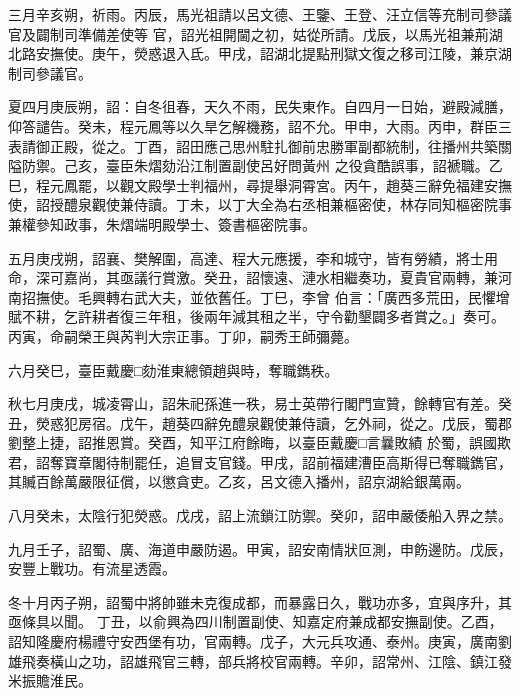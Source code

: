 \begin{pinyinscope}
 三月辛亥朔，祈雨。丙辰，馬光祖請以呂文德、王鑒、王登、汪立信等充制司參議官及闢制司準備差使等
 官，詔光祖開閫之初，姑從所請。戊辰，以馬光祖兼荊湖北路安撫使。庚午，熒惑退入氐。甲戌，詔湖北提點刑獄文復之移司江陵，兼京湖制司參議官。



 夏四月庚辰朔，詔：自冬徂春，天久不雨，民失東作。自四月一日始，避殿減膳，仰答譴告。癸未，程元鳳等以久旱乞解機務，詔不允。甲申，大雨。丙申，群臣三表請御正殿，從之。丁酉，詔田應己思州駐扎御前忠勝軍副都統制，往播州共築關隘防禦。己亥，臺臣朱熠劾沿江制置副使呂好問黃州
 之役貪酷誤事，詔褫職。乙巳，程元鳳罷，以觀文殿學士判福州，尋提舉洞霄宮。丙午，趙葵三辭免福建安撫使，詔授醴泉觀使兼侍讀。丁未，以丁大全為右丞相兼樞密使，林存同知樞密院事兼權參知政事，朱熠端明殿學士、簽書樞密院事。



 五月庚戌朔，詔襄、樊解圍，高達、程大元應援，李和城守，皆有勞績，將士用命，深可嘉尚，其亟議行賞激。癸丑，詔懷遠、漣水相繼奏功，夏貴官兩轉，兼河南招撫使。毛興轉右武大夫，並依舊任。丁巳，李曾
 伯言：「廣西多荒田，民懼增賦不耕，乞許耕者復三年租，後兩年減其租之半，守令勸墾闢多者賞之。」奏可。丙寅，命嗣榮王與芮判大宗正事。丁卯，嗣秀王師彌薨。



 六月癸巳，臺臣戴慶□劾淮東總領趙與時，奪職鐫秩。



 秋七月庚戌，城凌霄山，詔朱祀孫進一秩，易士英帶行閣門宣贊，餘轉官有差。癸丑，熒惑犯房宿。戊午，趙葵四辭免醴泉觀使兼侍讀，乞外祠，從之。戊辰，蜀郡劉整上捷，詔推恩賞。癸酉，知平江府餘晦，以臺臣戴慶□言曩敗績
 於蜀，誤國欺君，詔奪寶章閣待制罷任，追冒支官錢。甲戌，詔前福建漕臣高斯得已奪職鐫官，其贓百餘萬嚴限征償，以懲貪吏。乙亥，呂文德入播州，詔京湖給銀萬兩。



 八月癸未，太陰行犯熒惑。戊戌，詔上流鎖江防禦。癸卯，詔申嚴倭船入界之禁。



 九月壬子，詔蜀、廣、海道申嚴防遏。甲寅，詔安南情狀叵測，申飭邊防。戊辰，安豐上戰功。有流星透霞。



 冬十月丙子朔，詔蜀中將帥雖未克復成都，而暴露日久，戰功亦多，宜與序升，其亟條具以聞。
 丁丑，以俞興為四川制置副使、知嘉定府兼成都安撫副使。乙酉，詔知隆慶府楊禮守安西堡有功，官兩轉。戊子，大元兵攻通、泰州。庚寅，廣南劉雄飛奏橫山之功，詔雄飛官三轉，部兵將校官兩轉。辛卯，詔常州、江陰、鎮江發米振贍淮民。




\end{pinyinscope}
